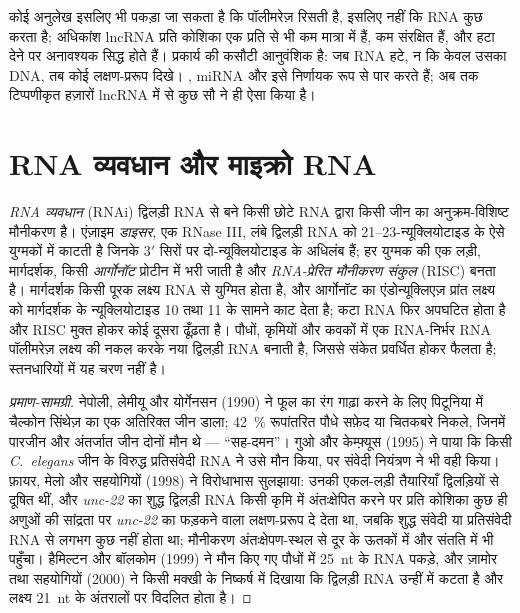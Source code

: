 \begin{remark}[बहुतायत प्रकार्य नहीं है]\label{rem:b3:rna-regulation:function}
कोई अनुलेख इसलिए भी पकड़ा जा सकता है कि पॉलीमरेज़ रिसती है, इसलिए नहीं
कि RNA कुछ करता है; अधिकांश lncRNA प्रति कोशिका एक प्रति से भी कम
मात्रा में हैं, कम संरक्षित हैं, और हटा देने पर अनावश्यक सिद्ध होते
हैं। प्रकार्य की कसौटी आनुवंशिक है: जब RNA हटे, न कि केवल उसका DNA, तब
कोई लक्षण-प्ररूप दिखे। \emph{}, miRNA और  इसे निर्णायक रूप से
पार करते हैं; अब तक टिप्पणीकृत हज़ारों lncRNA में से कुछ सौ ने ही ऐसा
किया है।
\end{remark}

\section{RNA व्यवधान और माइक्रो RNA}

\begin{definition}\label{def:b3:rna-regulation:rnai}
\emph{RNA व्यवधान} (RNAi) द्विलड़ी RNA से बने किसी छोटे RNA द्वारा किसी
जीन का अनुक्रम-विशिष्ट मौनीकरण है। एंज़ाइम \emph{डाइसर}, एक RNase III,
लंबे द्विलड़ी RNA को \numrange{21}{23}-न्यूक्लियोटाइड के ऐसे युग्मकों
में काटती है जिनके 3$'$ सिरों पर दो-न्यूक्लियोटाइड के अधिलंब हैं; हर
युग्मक की एक लड़ी, मार्गदर्शक, किसी \emph{आर्गोनॉट} प्रोटीन में भरी
जाती है और \emph{RNA-प्रेरित मौनीकरण संकुल} (RISC) बनता है।
मार्गदर्शक किसी पूरक लक्ष्य RNA से युग्मित होता है, और आर्गोनॉट का
एंडोन्यूक्लिएज़ प्रांत लक्ष्य को मार्गदर्शक के न्यूक्लियोटाइड 10 तथा
11 के सामने काट देता है; कटा RNA फिर अपघटित होता है और RISC मुक्त
होकर कोई दूसरा ढूँढ़ता है। पौधों, कृमियों और कवकों में एक RNA-निर्भर
RNA पॉलीमरेज़ लक्ष्य की नकल करके नया द्विलड़ी RNA बनाती है, जिससे संकेत
प्रवर्धित होकर फैलता है; स्तनधारियों में यह चरण नहीं है।
\end{definition}

\begin{proof}[प्रमाण-सामग्री]
नेपोली, लेमीयू और योर्गेनसन (1990) ने फूल का रंग गाढ़ा करने के लिए
पिटूनिया में चैल्कोन सिंथेज़ का एक अतिरिक्त जीन डाला; \qty{42}{\%}
रूपांतरित पौधे सफ़ेद या चितकबरे निकले, जिनमें पारजीन और अंतर्जात जीन
दोनों मौन थे --- ``सह-दमन''। गुओ और केम्फ़्यूस (1995) ने पाया कि किसी
\emph{C.~elegans} जीन के विरुद्ध प्रतिसंवेदी RNA ने उसे मौन किया, पर
संवेदी नियंत्रण ने भी वही किया। फ़ायर, मेलो और सहयोगियों (1998) ने
विरोधाभास सुलझाया: उनकी एकल-लड़ी तैयारियाँ द्विलड़ियों से दूषित थीं, और
\emph{unc-22} का शुद्ध द्विलड़ी RNA किसी कृमि में अंतःक्षेपित करने पर
प्रति कोशिका कुछ ही अणुओं की सांद्रता पर \emph{unc-22} का फड़कने वाला
लक्षण-प्ररूप दे देता था, जबकि शुद्ध संवेदी या प्रतिसंवेदी RNA से लगभग
कुछ नहीं होता था; मौनीकरण अंतःक्षेपण-स्थल से दूर के ऊतकों में और संतति
में भी पहुँचा। हैमिल्टन और बॉलकोम (1999) ने मौन किए गए पौधों में
\qty{25}{nt} के RNA पकड़े, और ज़ामोर तथा सहयोगियों (2000) ने किसी मक्खी
के निष्कर्ष में दिखाया कि द्विलड़ी RNA उन्हीं में कटता है और लक्ष्य
\qty{21}{nt} के अंतरालों पर विदलित होता है।
\end{proof}

